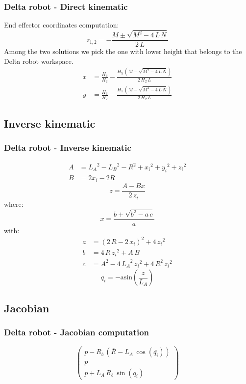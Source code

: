 %
\begin{frame}
\frametitle{Delta robot - Direct kinematic}
End effector coordinates computation:
	\begin{equation}
		z_{1,2} = -\frac{M \pm \sqrt{M^2-4\,L\,N}}{2\,L}
	\end{equation}
	Among the two solutions we pick the one with lower height that belongs to the Delta robot workspace.
	\begin{align}
		x &= \frac{H_{4}}{H_{2}}-\frac{H_{5}\,\left(M-\sqrt{M^2-4\,L\,N}\right)}{2\,H_{2}\,L}\\
		y &= \frac{H_{3}}{H_{2}}-\frac{H_{1}\,\left(M-\sqrt{M^2-4\,L\,N}\right)}{2\,H_{2}\,L}
	\end{align}
\end{frame}
%
\subsection{Inverse kinematic}
\begin{frame}
	\frametitle{Delta robot - Inverse kinematic}
	\begin{align}
		A &= {L_{A}}^2-{L_{B}}^2-R^2+{x_{i}}^2+{y_{i}}^2+{z_{i}}^2\\
		B &= 2x_{i}-2R
	\end{align}
	\begin{equation}
		z = \frac{A - Bx}{2\,z_{i}}
	\end{equation}
	where:
	\begin{equation}
		x = \frac{b+\sqrt{b^2-a\,c}}{a}
	\end{equation}
	with:
	\begin{align}
		a &= {\left(2\,R-2\,x_{i}\right)}^2+4\,{z_{i}}^2\\
		b &= 4\,R\,{z_{i}}^2 + A\,B\\
		c &= A^2 - 4\,{L_{A}}^2\,{z_{i}}^2+4\,R^2\,{z_{i}}^2
	\end{align}
	\begin{equation}
		q_i = -\mathrm{asin}\left(\frac{z}{L_{A}}\right)
	\end{equation}
\end{frame}
%
\subsection{Jacobian}
\begin{frame}
	\frametitle{Delta robot - Jacobian computation}
	\begin{equation}
		\left(\begin{array}{c} p-R_{b}\,\left(\overline{R}-L_{A}\,\cos\left(\overline{q_{i}}\right)\right)\\ p\\ p+L_{A}\,R_{b}\,\sin\left(\overline{q_{i}}\right) \end{array}\right)
	\end{equation}
\end{frame}